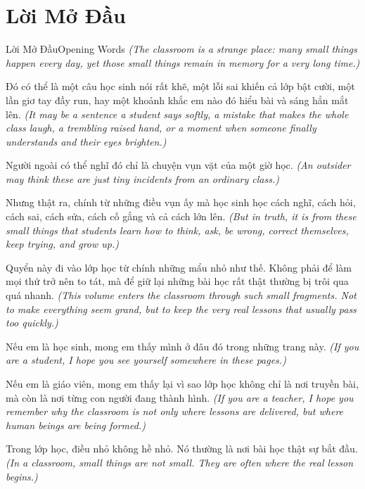 \chapter*{Lời Mở Đầu}

\begin{truyen}{Lời Mở Đầu}{Opening Words}
\textit{(The classroom is a strange place: many small things happen every day, yet those small things remain in memory for a very long time.)}

Đó có thể là một câu học sinh nói rất khẽ, một lỗi sai khiến cả lớp bật cười, một lần giơ tay đầy run, hay một khoảnh khắc em nào đó hiểu bài và sáng hẳn mắt lên.
\textit{(It may be a sentence a student says softly, a mistake that makes the whole class laugh, a trembling raised hand, or a moment when someone finally understands and their eyes brighten.)}

Người ngoài có thể nghĩ đó chỉ là chuyện vụn vặt của một giờ học.
\textit{(An outsider may think these are just tiny incidents from an ordinary class.)}

Nhưng thật ra, chính từ những điều vụn ấy mà học sinh học cách nghĩ, cách hỏi, cách sai, cách sửa, cách cố gắng và cả cách lớn lên.
\textit{(But in truth, it is from these small things that students learn how to think, ask, be wrong, correct themselves, keep trying, and grow up.)}

Quyển này đi vào lớp học từ chính những mẩu nhỏ như thế. Không phải để làm mọi thứ trở nên to tát, mà để giữ lại những bài học rất thật thường bị trôi qua quá nhanh.
\textit{(This volume enters the classroom through such small fragments. Not to make everything seem grand, but to keep the very real lessons that usually pass too quickly.)}

Nếu em là học sinh, mong em thấy mình ở đâu đó trong những trang này.
\textit{(If you are a student, I hope you see yourself somewhere in these pages.)}

Nếu em là giáo viên, mong em thấy lại vì sao lớp học không chỉ là nơi truyền bài, mà còn là nơi từng con người đang thành hình.
\textit{(If you are a teacher, I hope you remember why the classroom is not only where lessons are delivered, but where human beings are being formed.)}
\end{truyen}

\begin{baihoc}
Trong lớp học, điều nhỏ không hề nhỏ. Nó thường là nơi bài học thật sự bắt đầu.
\textit{(In a classroom, small things are not small. They are often where the real lesson begins.)}
\end{baihoc}

